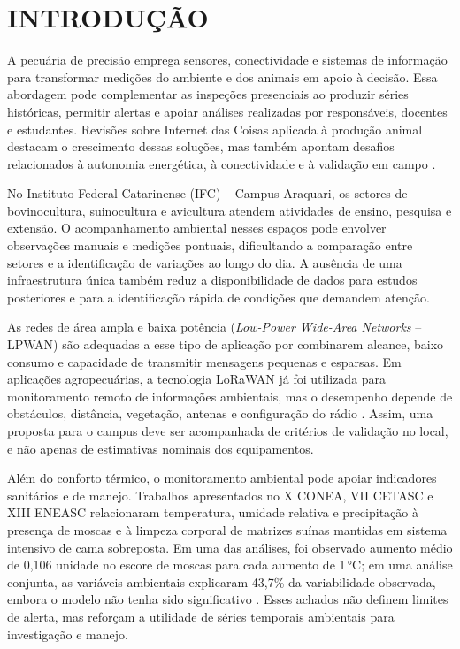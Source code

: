 \documentclass[12pt,a4paper]{article}
\begin{document}
\section{INTRODUÇÃO}

A pecuária de precisão emprega sensores, conectividade e sistemas de informação para transformar medições do ambiente e dos animais em apoio à decisão. Essa abordagem pode complementar as inspeções presenciais ao produzir séries históricas, permitir alertas e apoiar análises realizadas por responsáveis, docentes e estudantes. Revisões sobre Internet das Coisas aplicada à produção animal destacam o crescimento dessas soluções, mas também apontam desafios relacionados à autonomia energética, à conectividade e à validação em campo \cite{alves2025}.

No Instituto Federal Catarinense (IFC) -- Campus Araquari, os setores de bovinocultura, suinocultura e avicultura atendem atividades de ensino, pesquisa e extensão. O acompanhamento ambiental nesses espaços pode envolver observações manuais e medições pontuais, dificultando a comparação entre setores e a identificação de variações ao longo do dia. A ausência de uma infraestrutura única também reduz a disponibilidade de dados para estudos posteriores e para a identificação rápida de condições que demandem atenção.

As redes de área ampla e baixa potência (\textit{Low-Power Wide-Area Networks} -- LPWAN) são adequadas a esse tipo de aplicação por combinarem alcance, baixo consumo e capacidade de transmitir mensagens pequenas e esparsas. Em aplicações agropecuárias, a tecnologia LoRaWAN já foi utilizada para monitoramento remoto de informações ambientais, mas o desempenho depende de obstáculos, distância, vegetação, antenas e configuração do rádio \cite{fu2022,ahmed2025,ting2024}. Assim, uma proposta para o campus deve ser acompanhada de critérios de validação no local, e não apenas de estimativas nominais dos equipamentos.

Além do conforto térmico, o monitoramento ambiental pode apoiar indicadores sanitários e de manejo. Trabalhos apresentados no X CONEA, VII CETASC e XIII ENEASC relacionaram temperatura, umidade relativa e precipitação à presença de moscas e à limpeza corporal de matrizes suínas mantidas em sistema intensivo de cama sobreposta. Em uma das análises, foi observado aumento médio de 0,106 unidade no escore de moscas para cada aumento de 1\,°C; em uma análise conjunta, as variáveis ambientais explicaram 43,7\% da variabilidade observada, embora o modelo não tenha sido significativo \cite{macedo_moraes_cruz2026}. Esses achados não definem limites de alerta, mas reforçam a utilidade de séries temporais ambientais para investigação e manejo.
\end{document}

